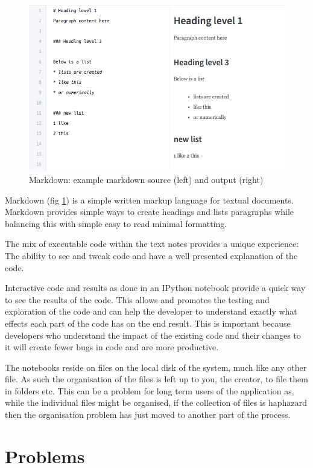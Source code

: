 \begin{figure}
  \includegraphics[width=\linewidth]{Figures/markdown.png}
  \caption{Markdown: example markdown source (left) and output (right)}
  \label{fig:markdownexample}
\end{figure}

Markdown (fig \ref{fig:markdownexample}) is a simple written markup language for
textual documents. Markdown provides simple ways to create headings and lists
paragraphs while balancing this with simple easy to read minimal formatting.

The mix of executable code within the text notes provides a unique
experience: The ability to see and tweak code and have a well
presented explanation of the code.

Interactive code and results as done in an IPython notebook provide a
quick way to see the results of the code. This allows and promotes the
testing and exploration of the code and can help the developer to
understand exactly what effects each part of the code has on the end
result. This is important because developers who understand the impact of the
existing code and their changes to it will create fewer bugs in code and are
more productive.

The notebooks reside on files on the local disk of the system, much like
any other file. As such the organisation of the files is left up to you,
the creator, to file them in folders etc. This can be a problem for long term
users of the application as, while the individual files might be organised, if
the collection of files is haphazard then the organisation problem has just
moved to another part of the process.

\section{Problems}\label{problems}

